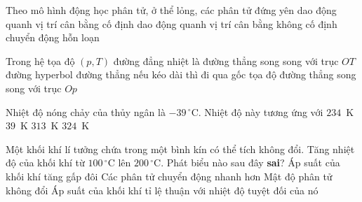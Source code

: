 	\begin{ex}%
		Theo mô hình động học phân tử, ở thể lỏng, các phân tử
		\choice
		{đứng yên}
		{dao động quanh vị trí cân bằng cố định}
		{\True dao động quanh vị trí cân bằng không cố định}
		{chuyển động hỗn loạn}
	\end{ex}

	\begin{ex}%
		Trong hệ tọa độ $(p,T)$ đường đẳng nhiệt là
		\choice
		{đường thẳng song song với trục $OT$}
		{đường hyperbol}
		{đường thẳng nếu kéo dài thì đi qua gốc tọa độ}
		{\True đường thẳng song song với trục $Op$}
	\end{ex}

	\begin{ex}%
		Nhiệt độ nóng chảy của thủy ngân là $-39\,^\circ\text{C}$. Nhiệt độ này tương ứng với
		\choice
		{\True $234$~K}
		{$39$~K}
		{$313$~K}
		{$324$~K}
	\end{ex}

	\begin{ex}%
		Một khối khí lí tưởng chứa trong một bình kín có thể tích không đổi. Tăng nhiệt độ của khối khí từ $100\,^\circ\text{C}$ lên $200\,^\circ\text{C}$. Phát biểu nào sau đây \textbf{sai}?
		\choice
		{\True Áp suất của khối khí tăng gấp đôi}
		{Các phân tử chuyển động nhanh hơn}
		{Mật độ phân tử không đổi}
		{Áp suất của khối khí tỉ lệ thuận với nhiệt độ tuyệt đối của nó}
	\end{ex}

